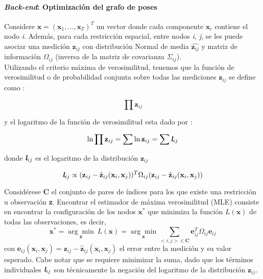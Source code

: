\paragraph{\textit{Back-end}: Optimización del grafo de poses}

Considere $\textbf{x} = (\textbf{x}_{1}, ..., \textbf{x}_{T})^{T}$ un vector donde cada componente $\textbf{x}_{i}$ contiene el nodo \textsl{i}. Además, para cada restricción espacial, entre nodos \textsl{i, j}, se les puede asociar una medición $\textbf{z}_{ij}$ con distribución Normal de media $\hat{\textbf{z}_{ij}}$ y matriz de información $\Omega_{ij}$ (inversa de la matriz de covarianza $\Sigma_{ij}$). \\
Utilizando el criterio máxima de verosimilitud, tenemos que la función de verosimilitud o de probabilidad conjunta \cite{wiki-mle} sobre todas las mediciones $\textbf{z}_{ij}$ se define como :

\begin{equation}
\prod{\textbf{z}_{ij}}
\end{equation}

y el logaritmo de la función de verosimilitud esta dado por :

\begin{equation}
\ln \prod{\textbf{z}_{ij}} = \sum{\ln \textbf{z}_{ij}} = \sum{\textit{\textbf{l}}_{ij}}
\end{equation}

donde $\textit{\textbf{l}}_{ij}$ es el logaritmo de la distribución $\textbf{z}_{ij}$

\begin{equation}
\textit{\textbf{l}}_{ij} \propto (\textbf{z}_{ij}-\hat{\textbf{z}}_{ij}(\textbf{x}_{i},\textbf{x}_{j}))^{T}\Omega_{ij}(\textbf{z}_{ij}-\hat{\textbf{z}}_{ij}(\textbf{x}_{i},\textbf{x}_{j}))
\end{equation}

Considérese \textbf{C} el conjunto de pares de índices para los que existe una restricción u observación \textbf{z}. Encontrar el estimador de máxima verosimilitud (MLE) consiste en encontrar la configuración de los nodos $\textbf{x}^{*}$ que minimiza la función $\textit{L}(\textbf{x})$ de todas las observaciones, es decir,
\begin{equation}
\textbf{x}^{*} = \underset{\textbf{x}}{\arg\min}\ L(\textbf{x}) = \underset{\textbf{x}}{\arg\min} \sum_{<i,j>\in \mathcal{\textbf{C}}}\textbf{e}_{ij}^{T}\Omega_{ij}\textbf{e}_{ij}
\end{equation}
con $\textbf{e}_{ij}(\textbf{x}_{i},\textbf{x}_{j})=\textbf{z}_{ij}-\hat{\textbf{z}}_{ij}(\textbf{x}_{i},\textbf{x}_{j})$ el error entre la medición y su valor esperado.
Cabe notar que se requiere minimizar la suma, dado que los términos individuales $\textit{\textbf{l}}_{ij}$ son técnicamente la negación del logaritmo de la distribución $\textbf{z}_{ij}$.

